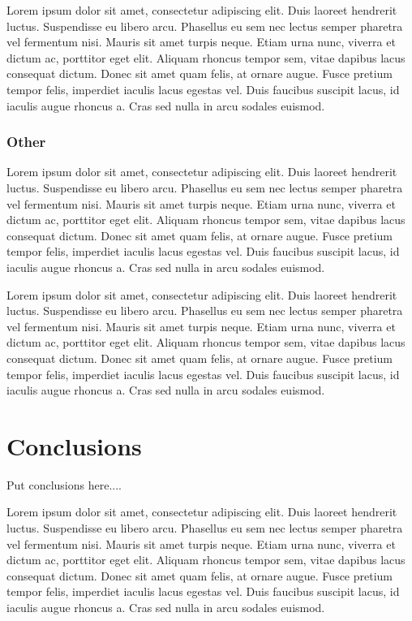 \documentclass[final,conference,10pt]{IEEEtran}
\begin{document}
Lorem ipsum dolor sit amet, consectetur adipiscing elit. Duis laoreet hendrerit luctus. Suspendisse eu libero arcu. Phasellus eu sem nec lectus semper pharetra vel fermentum nisi. Mauris sit amet turpis neque. Etiam urna nunc, viverra et dictum ac, porttitor eget elit. Aliquam rhoncus tempor sem, vitae dapibus lacus consequat dictum. Donec sit amet quam felis, at ornare augue. Fusce pretium tempor felis, imperdiet iaculis lacus egestas vel. Duis faucibus suscipit lacus, id iaculis augue rhoncus a. Cras sed nulla in arcu sodales euismod.

\subsubsection{Other}
Lorem ipsum dolor sit amet, consectetur adipiscing elit. Duis laoreet hendrerit luctus. Suspendisse eu libero arcu. Phasellus eu sem nec lectus semper pharetra vel fermentum nisi. Mauris sit amet turpis neque. Etiam urna nunc, viverra et dictum ac, porttitor eget elit. Aliquam rhoncus tempor sem, vitae dapibus lacus consequat dictum. Donec sit amet quam felis, at ornare augue. Fusce pretium tempor felis, imperdiet iaculis lacus egestas vel. Duis faucibus suscipit lacus, id iaculis augue rhoncus a. Cras sed nulla in arcu sodales euismod.

Lorem ipsum dolor sit amet, consectetur adipiscing elit. Duis laoreet hendrerit luctus. Suspendisse eu libero arcu. Phasellus eu sem nec lectus semper pharetra vel fermentum nisi. Mauris sit amet turpis neque. Etiam urna nunc, viverra et dictum ac, porttitor eget elit. Aliquam rhoncus tempor sem, vitae dapibus lacus consequat dictum. Donec sit amet quam felis, at ornare augue. Fusce pretium tempor felis, imperdiet iaculis lacus egestas vel. Duis faucibus suscipit lacus, id iaculis augue rhoncus a. Cras sed nulla in arcu sodales euismod.

\section{Conclusions}

Put conclusions here....

Lorem ipsum dolor sit amet, consectetur adipiscing elit. Duis laoreet hendrerit luctus. Suspendisse eu libero arcu. Phasellus eu sem nec lectus semper pharetra vel fermentum nisi. Mauris sit amet turpis neque. Etiam urna nunc, viverra et dictum ac, porttitor eget elit. Aliquam rhoncus tempor sem, vitae dapibus lacus consequat dictum. Donec sit amet quam felis, at ornare augue. Fusce pretium tempor felis, imperdiet iaculis lacus egestas vel. Duis faucibus suscipit lacus, id iaculis augue rhoncus a. Cras sed nulla in arcu sodales euismod.
\end{document}
